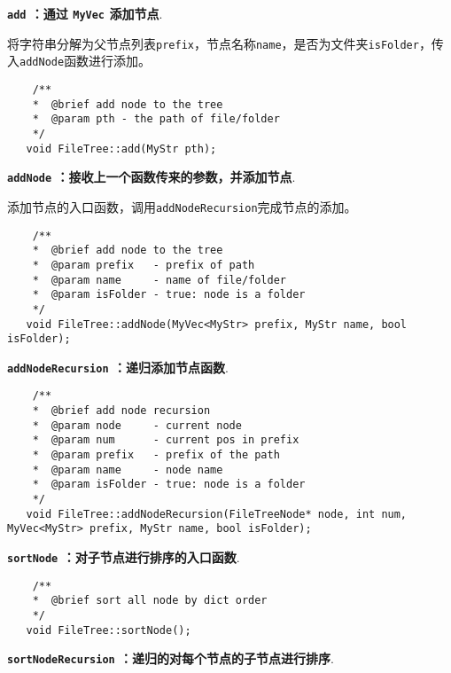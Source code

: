 \documentclass[a4paper]{ctexart}
\begin{document}
\noindent \textbf{\texttt{add} ：通过 \texttt{MyVec} 添加节点}.

将字符串分解为父节点列表\texttt{prefix}，节点名称\texttt{name}，是否为文件夹\texttt{isFolder}，传入\texttt{addNode}函数进行添加。

\begin{lstlisting}
    /**
    *  @brief add node to the tree
    *  @param pth - the path of file/folder
    */
   void FileTree::add(MyStr pth);
\end{lstlisting}

\vspace{2em}

\noindent \textbf{\texttt{addNode} ：接收上一个函数传来的参数，并添加节点}.

添加节点的入口函数，调用\texttt{addNodeRecursion}完成节点的添加。

\begin{lstlisting}
    /**
    *  @brief add node to the tree
    *  @param prefix   - prefix of path
    *  @param name     - name of file/folder
    *  @param isFolder - true: node is a folder
    */
   void FileTree::addNode(MyVec<MyStr> prefix, MyStr name, bool isFolder);
\end{lstlisting}

\vspace{2em}

\noindent \textbf{\texttt{addNodeRecursion} ：递归添加节点函数}.

\begin{lstlisting}
    /**
    *  @brief add node recursion
    *  @param node     - current node
    *  @param num      - current pos in prefix
    *  @param prefix   - prefix of the path
    *  @param name     - node name
    *  @param isFolder - true: node is a folder
    */
   void FileTree::addNodeRecursion(FileTreeNode* node, int num, MyVec<MyStr> prefix, MyStr name, bool isFolder);
\end{lstlisting}

\vspace{2em}

\noindent \textbf{\texttt{sortNode} ：对子节点进行排序的入口函数}.

\begin{lstlisting}
    /**
    *  @brief sort all node by dict order
    */
   void FileTree::sortNode();
\end{lstlisting}

\vspace{3em}

\noindent \textbf{\texttt{sortNodeRecursion} ：递归的对每个节点的子节点进行排序}.
\end{document}
